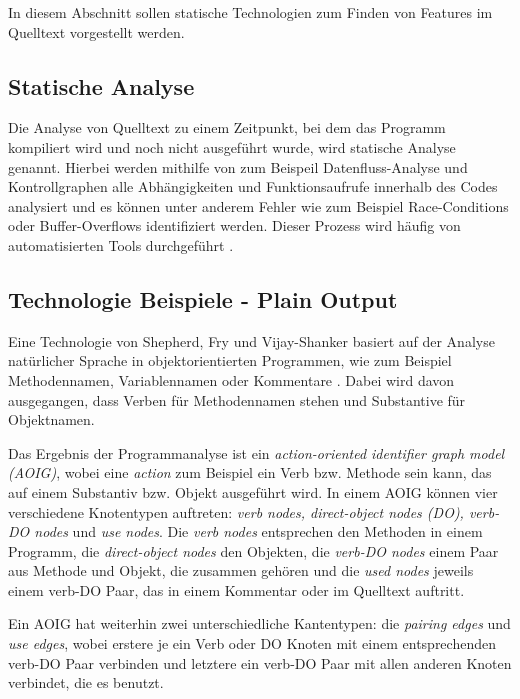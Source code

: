 \documentclass[runningheads,a4paper]{llncs}
\begin{document}
In diesem Abschnitt sollen statische Technologien zum Finden von Features im Quelltext vorgestellt werden.

\subsection*{Statische Analyse}

Die Analyse von Quelltext zu einem Zeitpunkt, bei dem das Programm kompiliert wird und noch nicht ausgeführt wurde, wird statische Analyse genannt. Hierbei werden mithilfe von zum Beispeil Datenfluss-Analyse und Kontrollgraphen alle Abhängigkeiten und Funktionsaufrufe innerhalb des Codes analysiert und es können unter anderem Fehler wie zum Beispiel Race-Conditions oder Buffer-Overflows identifiziert werden. Dieser Prozess wird häufig von automatisierten Tools durchgeführt \cite{static}.

\subsection*{Technologie Beispiele - Plain Output}

Eine Technologie von Shepherd, Fry und Vijay-Shanker basiert auf der Analyse natürlicher Sprache in objektorientierten Programmen, wie zum Beispiel Methodennamen, Variablennamen oder Kommentare \cite{shepherd}. Dabei wird davon ausgegangen, dass Verben für Methodennamen stehen und Substantive für Objektnamen.

Das Ergebnis der Programmanalyse ist ein \textit{action-oriented identifier graph model (AOIG)}, wobei eine \textit{action} zum Beispiel ein Verb bzw. Methode sein kann, das auf einem Substantiv bzw. Objekt ausgeführt wird. In einem AOIG können vier verschiedene Knotentypen auftreten: \textit{verb nodes, direct-object nodes (DO), verb-DO nodes} und \textit{use nodes}. Die \textit{verb nodes} entsprechen den Methoden in einem Programm, die \textit{direct-object nodes} den Objekten, die \textit{verb-DO nodes} einem Paar aus Methode und Objekt, die zusammen gehören und die \textit{used nodes} jeweils einem verb-DO Paar, das in einem Kommentar oder im Quelltext auftritt.

Ein AOIG hat weiterhin zwei unterschiedliche Kantentypen: die \textit{pairing edges} und \textit{use edges}, wobei erstere je ein Verb oder DO Knoten mit einem entsprechenden verb-DO Paar verbinden und letztere ein verb-DO Paar mit allen anderen Knoten verbindet, die es benutzt.
\end{document}

